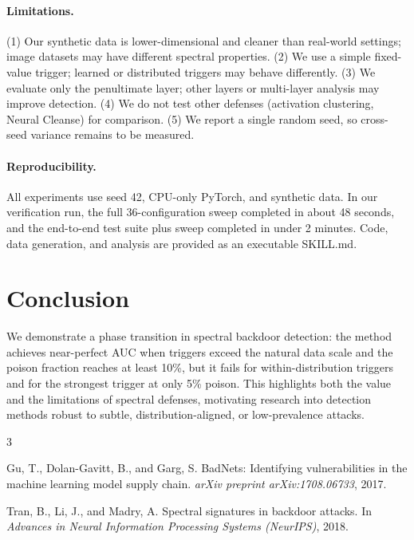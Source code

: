 \documentclass[11pt,a4paper]{article}
\begin{document}
\paragraph{Limitations.} (1) Our synthetic data is lower-dimensional and cleaner than real-world settings; image datasets may have different spectral properties. (2) We use a simple fixed-value trigger; learned or distributed triggers may behave differently. (3) We evaluate only the penultimate layer; other layers or multi-layer analysis may improve detection. (4) We do not test other defenses (activation clustering, Neural Cleanse) for comparison. (5) We report a single random seed, so cross-seed variance remains to be measured.

\paragraph{Reproducibility.} All experiments use seed 42, CPU-only PyTorch, and synthetic data. In our verification run, the full 36-configuration sweep completed in about 48 seconds, and the end-to-end test suite plus sweep completed in under 2 minutes. Code, data generation, and analysis are provided as an executable SKILL.md.

\section{Conclusion}

We demonstrate a phase transition in spectral backdoor detection: the method achieves near-perfect AUC when triggers exceed the natural data scale and the poison fraction reaches at least 10\%, but it fails for within-distribution triggers and for the strongest trigger at only 5\% poison. This highlights both the value and the limitations of spectral defenses, motivating research into detection methods robust to subtle, distribution-aligned, or low-prevalence attacks.


\begin{thebibliography}{3}

Gu, T., Dolan-Gavitt, B., and Garg, S.
\newblock BadNets: Identifying vulnerabilities in the machine learning model supply chain.
\newblock \emph{arXiv preprint arXiv:1708.06733}, 2017.

Tran, B., Li, J., and Madry, A.
\newblock Spectral signatures in backdoor attacks.
\newblock In \emph{Advances in Neural Information Processing Systems (NeurIPS)}, 2018.

\end{thebibliography}
\end{document}
